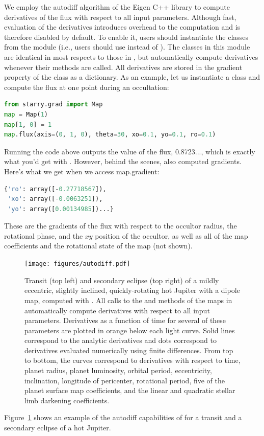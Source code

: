 \documentclass[modern]{aastex61}
\begin{document}
We employ the autodiff algorithm of the Eigen \citep{eigen} C++ library to compute
derivatives of the flux with respect to all input parameters. Although fast,
evaluation of the derivatives introduces overhead to the computation
and is therefore disabled by default. To enable it, users should instantiate the
\starry classes from the \starrygrad module (i.e., users should use
\gradMap instead of \starryMap). The classes in this module are
identical in most respects to those in \starry, but automatically compute derivatives
whenever their methods are called. All derivatives are stored in the \textsf{gradient}
property of the class as a dictionary. As an example, let us instantiate a \gradMap
class and compute the flux at one point during an occultation:
%
\begin{lstlisting}[language=Python,firstnumber=last]
from starry.grad import Map
map = Map(1)
map[1, 0] = 1
map.flux(axis=(0, 1, 0), theta=30, xo=0.1, yo=0.1, ro=0.1)
\end{lstlisting}
%
Running the code above outputs the value of the flux, \textsf{0.8723...},
which is exactly what you'd get with \starryMap. However, behind the scenes,
\starry also computed gradients. Here's what we get when we access \textsf{map.gradient}:
%
\begin{lstlisting}[language=Python,firstnumber=last]
{'ro': array([-0.27718567]),
 'xo': array([-0.0063251]),
 'yo': array([0.00134985])...}
\end{lstlisting}
%
These are the gradients of the flux with respect to the occultor radius,
the rotational phase, and the $xy$ position of the occultor, as well as
all of the map coefficients and the rotational state of the map (not shown).
%
\begin{figure}[p!]
    \begin{centering}
    \texttt{[image: figures/autodiff.pdf]}
    \caption{\label{fig:autodiff}
             Transit (top left) and secondary eclipse (top right) of a mildly
             eccentric, slightly inclined, quickly-rotating hot Jupiter with a
             dipole map, computed with \gradMap. All calls to the \gradflux
             and \gradeval methods of the maps in \starrygrad automatically
             compute derivatives with respect to all input parameters. Derivatives
             as a function of time for several of these parameters are plotted in
             orange below each light curve. Solid lines correspond to the analytic
             derivatives and dots correspond to derivatives evaluated numerically
             using finite differences. From top to bottom, the curves correspond
             to derivatives with respect to time, planet radius, planet luminosity,
             orbital period, eccentricity, inclination, longitude of pericenter,
             rotational period, five of the planet surface map coefficients, and
             the linear and quadratic stellar limb darkening coefficients.
             }
    \end{centering}
\end{figure}
%
Figure~\ref{fig:autodiff} shows an example of the autodiff capabilities of
\starry for a transit and a secondary eclipse of a hot Jupiter.
\end{document}
